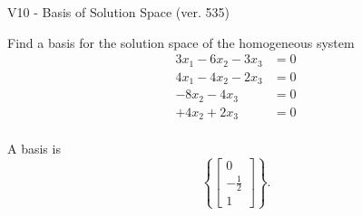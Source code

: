\begin{exercise}
  \begin{exerciseTitle}V10 - Basis of Solution Space (ver. 535)\end{exerciseTitle}
  \begin{exerciseStatement}
    Find a basis for the solution space of the homogeneous system 
\begin{align*}
 3 x_ 1 -6 x_ 2 -3 x_ 3 &= 0  \\ 
  4 x_ 1 -4 x_ 2 -2 x_ 3 &= 0  \\ 
  -8 x_ 2 -4 x_ 3 &= 0  \\ 
  + 4 x_ 2 + 2 x_ 3 &= 0  \\ 
 \end{align*}


 
  \end{exerciseStatement}

  \begin{exerciseAnswer}
   A basis is   
\[\left\{\left[\begin{array}{c}
0 \\
-\frac{1}{2} \\
1
\end{array}\right]\right\}.\]

  


  \end{exerciseAnswer}
\end{exercise}